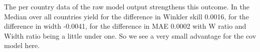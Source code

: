 The per country data of the raw model output strengthens this outcome. In the Median over all countries yield for the difference in Winkler skill 0.0016, for the difference in width -0.0041, for the difference in MAE 0.0002 with W ratio and Width ratio being a little under one. So we see a very small advantage for the cov model here.
